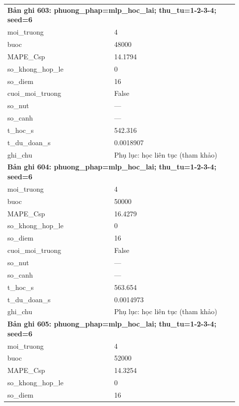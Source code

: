 \begin{longtable}{p{0.43\linewidth}p{0.50\linewidth}}
\midrule
\multicolumn{2}{p{0.95\linewidth}}{\textbf{Bản ghi 603: phuong\_phap=mlp\_hoc\_lai; thu\_tu=1-2-3-4; seed=6}} \\
moi\_\allowbreak truong & 4 \\
buoc & 48000 \\
MAPE\_\allowbreak Csp & 14.1794 \\
so\_\allowbreak khong\_\allowbreak hop\_\allowbreak le & 0 \\
so\_\allowbreak diem & 16 \\
cuoi\_\allowbreak moi\_\allowbreak truong & False \\
so\_\allowbreak nut & — \\
so\_\allowbreak canh & — \\
t\_\allowbreak hoc\_\allowbreak s & 542.316 \\
t\_\allowbreak du\_\allowbreak doan\_\allowbreak s & 0.0018907 \\
ghi\_\allowbreak chu & Phụ lục: học liên tục (tham khảo) \\
\midrule
\multicolumn{2}{p{0.95\linewidth}}{\textbf{Bản ghi 604: phuong\_phap=mlp\_hoc\_lai; thu\_tu=1-2-3-4; seed=6}} \\
moi\_\allowbreak truong & 4 \\
buoc & 50000 \\
MAPE\_\allowbreak Csp & 16.4279 \\
so\_\allowbreak khong\_\allowbreak hop\_\allowbreak le & 0 \\
so\_\allowbreak diem & 16 \\
cuoi\_\allowbreak moi\_\allowbreak truong & False \\
so\_\allowbreak nut & — \\
so\_\allowbreak canh & — \\
t\_\allowbreak hoc\_\allowbreak s & 563.654 \\
t\_\allowbreak du\_\allowbreak doan\_\allowbreak s & 0.0014973 \\
ghi\_\allowbreak chu & Phụ lục: học liên tục (tham khảo) \\
\midrule
\multicolumn{2}{p{0.95\linewidth}}{\textbf{Bản ghi 605: phuong\_phap=mlp\_hoc\_lai; thu\_tu=1-2-3-4; seed=6}} \\
moi\_\allowbreak truong & 4 \\
buoc & 52000 \\
MAPE\_\allowbreak Csp & 14.3254 \\
so\_\allowbreak khong\_\allowbreak hop\_\allowbreak le & 0 \\
so\_\allowbreak diem & 16 \\

\end{longtable}

